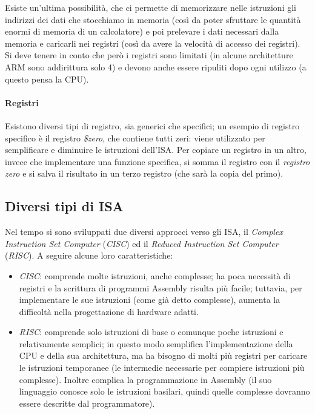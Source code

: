 \documentclass[class=book, crop=false]{standalone}
\begin{document}
Esiste un'ultima possibilità, che ci permette di memorizzare nelle istruzioni gli indirizzi dei dati che stocchiamo in memoria (così da poter sfruttare le quantità enormi di memoria di un calcolatore) e poi prelevare i dati necessari dalla memoria e caricarli nei registri (così da avere la velocità di accesso dei registri).\\
Si deve tenere in conto che però i registri sono limitati (in alcune architetture ARM sono addirittura solo 4) e devono anche essere ripuliti dopo ogni utilizzo (a questo pensa la CPU).

\paragraph*{Registri}
Esistono diversi tipi di registro, sia generici che specifici; un esempio di registro specifico è il registro \emph{\$zero}, che contiene tutti zeri: viene utilizzato per semplificare e diminuire le istruzioni dell’ISA. Per copiare un registro in un altro, invece che implementare una funzione specifica, si somma il registro con il \emph{registro zero} e si salva il risultato in un terzo registro (che sarà la copia del primo).

\subsection{Diversi tipi di ISA}
Nel tempo si sono sviluppati due diversi approcci verso  gli ISA, il \emph{Complex Instruction Set Computer} (\emph{CISC}) ed il \emph{Reduced Instruction Set Computer} (\emph{RISC}). A seguire alcune loro caratteristiche:
\begin{itemize}
	\item \emph{CISC}: comprende molte istruzioni, anche complesse; ha poca necessità di registri e la scrittura di programmi Assembly risulta più facile; tuttavia, per implementare le sue istruzioni (come già detto complesse), aumenta la difficoltà nella progettazione di hardware adatti.
	\item \emph{RISC}: comprende solo istruzioni di base o comunque poche istruzioni e relativamente semplici; in questo modo semplifica l’implementazione della CPU e della sua architettura, ma ha bisogno di molti più registri per caricare le istruzioni temporanee (le intermedie necessarie per compiere istruzioni più complesse). Inoltre complica la programmazione in Assembly (il suo linguaggio conosce solo le istruzioni basilari, quindi quelle complesse dovranno essere descritte dal programmatore).
\end{itemize}
\end{document}
